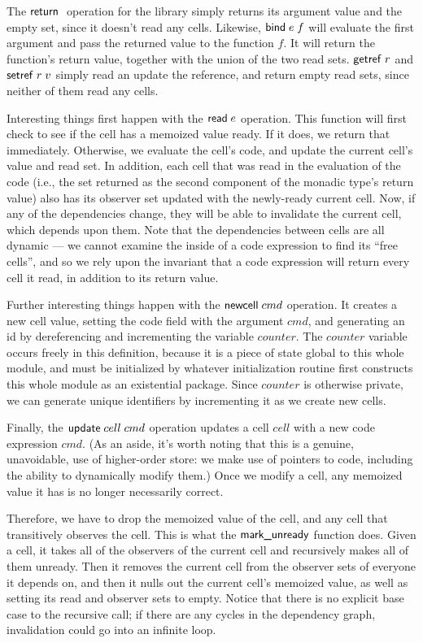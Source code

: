 \documentclass[preprint,natbib]{sigplanconf}
\begin{document}
The $\mbox{\textsf{{return}}}\;$ operation for the library simply returns its argument
value and the empty set, since it doesn't read any cells. Likewise,
$\mbox{\textsf{{bind}}}\; e\;f$ will evaluate the first argument and pass the returned
value to the function $f$. It will return the function's return value,
together with the union of the two read sets. $\mbox{\textsf{{getref}}}\; r$ and $\mbox{\textsf{{setref}}}\; r\;v$
simply read an update the reference, and return empty read sets, since
neither of them read any cells. 

Interesting things first happen with the $\mbox{\textsf{{read}}}\; e$ operation. This
function will first check to see if the cell has a memoized value
ready. If it does, we return that immediately. Otherwise, we evaluate
the cell's code, and update the current cell's value and read set. In
addition, each cell that was read in the evaluation of the code (i.e.,
the set returned as the second component of the monadic type's return
value) also has its observer set updated with the newly-ready current
cell. Now, if any of the dependencies change, they will be able to
invalidate the current cell, which depends upon them. Note that the
dependencies between cells are all dynamic --- we cannot examine the
inside of a code expression to find its ``free cells'', and so we rely
upon the invariant that a code expression will return every cell it
read, in addition to its return value.

Further interesting things happen with the $\mbox{\textsf{{newcell}}}\;cmd$
operation.  It creates a new cell value, setting the code field with
the argument $cmd$, and generating an id by dereferencing and
incrementing the variable $counter$. The $counter$ variable occurs
freely in this definition, because it is a piece of state global to
this whole module, and must be initialized by whatever initialization
routine first constructs this whole module as an existential package.
Since $counter$ is otherwise private, we can generate unique
identifiers by incrementing it as we create new cells. 

Finally, the $\mbox{\textsf{{update}}}\;cell\;cmd$ operation updates a cell
$cell$ with a new code expression $cmd$. (As an aside, it's worth
noting that this is a genuine, unavoidable, use of higher-order store:
we make use of pointers to code, including the ability to dynamically
modify them.) Once we modify a cell, any memoized value it has is no
longer necessarily correct.

Therefore, we have to drop the memoized value of the cell, and any
cell that transitively observes the cell. This is what the
$\mbox{\textsf{{mark\_unready}}}$ function does. Given a cell, it takes all of the
observers of the current cell and recursively makes all of
them unready. Then it removes the current cell from the observer sets of
everyone it depends on, and then it nulls out the current cell's
memoized value, as well as setting its read and observer sets to
empty. Notice that there is no explicit base case to the recursive
call; if there are any cycles in the dependency graph, invalidation
could go into an infinite loop. 
\end{document}
